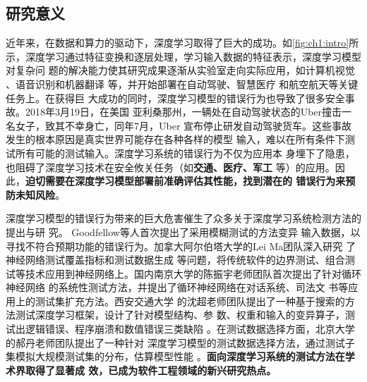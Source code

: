 
\subsection{研究意义}



%
近年来，在数据和算力的驱动下，深度学习取得了巨大的成功。如\cref{fig:ch1:intro}所
示，深度学习通过特征变换和逐层处理，学习输入数据的特征表示，深度学习模型对复杂问
题的解决能力使其研究成果逐渐从实验室走向实际应用，如计算机视觉
、语音识别和机器翻译
等，并开始部署在自动驾驶、智慧医疗
和航空航天等关键任务上。在获得巨
大成功的同时，深度学习模型的错误行为也导致了很多安全事故。2018年3月19日，在美国
亚利桑那州，一辆处在自动驾驶状态的Uber撞击一名女子，致其不幸身亡，同年7月，Uber
宣布停止研发自动驾驶货车。这些事故发生的根本原因是真实世界可能存在各种各样的模型
输入，难以在所有条件下测试所有可能的测试输入。深度学习系统的错误行为不仅为应用本
身埋下了隐患，也阻碍了深度学习技术在安全攸关任务（如\textbf{交通、医疗、军工}
等）的应用。因此，\textbf{迫切需要在深度学习模型部署前准确评估其性能，找到潜在的
错误行为来预防未知风险}。%




深度学习模型的错误行为带来的巨大危害催生了众多关于深度学习系统检测方法的提出与研
究。 Goodfellow等人首次提出了采用模糊测试的方法变异
输入数据，以寻找不符合预期功能的错误行为。加拿大阿尔伯塔大学的Lei Ma团队深入研究
了神经网络测试覆盖指标和测试数据生成
等问题，将传统软件的边界测试、组合测
试等技术应用到神经网络上。国内南京大学的陈振宇老师团队首次提出了针对循环神经网络
的系统性测试方法，并提出了循环神经网络在对话系统、司法文
书等应用上的测试集扩充方法。西安交通大学
的沈超老师团队提出了一种基于搜索的方法测试深度学习框架，设计了针对模型结构、参
数、权重和输入的变异算子，测试出逻辑错误、程序崩溃和数值错误三类缺陷
。在测试数据选择方面，北京大学的郝丹老师团队提出了一种针对
深度学习模型的测试数据选择方法，通过测试子集模拟大规模测试集的分布，估算模型性能
。\textbf{面向深度学习系统的测试方法在学术界取得了显著成
效，已成为软件工程领域的新兴研究热点。}

